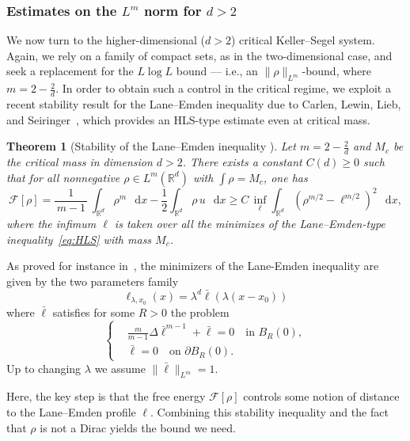 \documentclass[11pt,a4paper]{article}
\numberwithin{equation}{section}
\newcommand{\R}{{\mathbb{R}}}
\theoremstyle{plain}
\newtheorem{theorem}{Theorem}[section]
\theoremstyle{remark}
\newcommand {\f}{\frac}
\newcommand{\diff}{\mathop{}\!\mathrm{d}}
\begin{document}
\subsubsection{Estimates on the \texorpdfstring{$L^m$}{Lm} norm for \texorpdfstring{$d>2$}{d>2}}\label{sec:Estimates Lm}


We now turn to the higher-dimensional ($d>2$) critical Keller--Segel system. Again, we rely on a family of compact sets, as in the two-dimensional case, and seek a replacement for the $L \log L$ bound — i.e., an $\|\rho\|_{L^m}$-bound, where $m = 2 - \frac{2}{d}$. In order to obtain such a control in the critical regime, we exploit a recent stability result for the Lane--Emden inequality due to Carlen, Lewin, Lieb, and Seiringer~\cite{Carlen_Lewin_Lieb_Seiringer24}, which provides an HLS-type estimate even at critical mass.

\medskip

\noindent

\begin{theorem}[Stability of the Lane--Emden inequality {\cite{Carlen_Lewin_Lieb_Seiringer24}}]\label{thm:stability_lane_emden}
Let $m = 2 - \frac{2}{d}$ and $M_c$ be the critical mass in dimension $d>2$. There exists a constant $C(d) \ge 0$ such that for all nonnegative $\rho\in L^m(\R^d)$ with $\int \rho = M_c$, one has
\[
\mathcal{F}[\rho]
  = 
\f{1}{\,m-1\,}\,\int_{\R^d}\rho^m \,\diff x 
  -  
\frac12 \int_{\R^d}\rho\,u \,\diff x
  \ge 
C\,\inf_{\ell}\int_{\R^d}\left(\rho^{m/2} - \ell^{m/2}\right)^2\,\diff x,
\]
where the infimum $\ell$ is taken over all the minimizes of the Lane--Emden-type inequality~\eqref{eq:HLS} with mass $M_c$.  
\end{theorem}

As proved for instance in~\cite[Proposition 3.5]{Blanchet_Carrillo_Laurencot09}, the minimizers of the Lane-Emden inequality are given by the two parameters family 
$$
\ell_{\lambda,x_0}(x)= \lambda^d \bar{\ell}(\lambda(x-x_0))
$$
where $\bar{\ell}$ satisfies for some $R>0$ the problem
$$
\begin{cases}
&\f{m}{m-1}\Delta \bar{\ell}^{m-1} +\bar{\ell}=0 \quad  \text{in $B_{R}(0)$}, \\
&\bar{\ell}=0 \quad  \text{on $\partial B_{R}(0)$}.
\end{cases}
$$
Up to changing $\lambda$ we assume $\|\bar{\ell}\|_{L^m}=1$.

Here, the key step is that the free energy $\mathcal{F}[\rho]$ controls some notion of distance to the Lane--Emden profile $\ell$. Combining this stability inequality and the fact that $\rho$ is not a  Dirac yields the bound we need.
\end{document}

